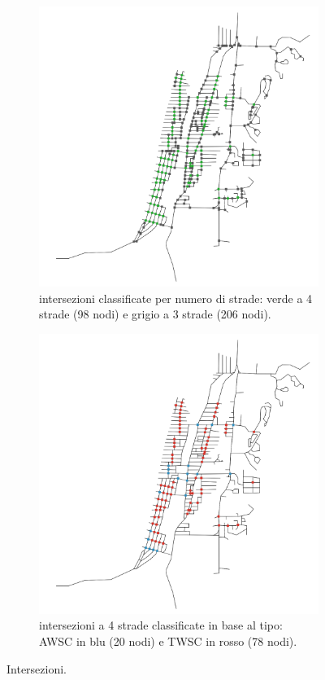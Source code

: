 \begin{figure}[ht]
    \centering
    \begin{subfigure}{0.475\textwidth}
        \includegraphics[width=\textwidth]{images/intersections}
        \caption{intersezioni classificate per numero di strade: verde a 4 strade (98 nodi) e grigio a 3 strade (206 nodi).}
        \label{fig:intersections}
    \end{subfigure}
    \hfill
    \begin{subfigure}{0.475\textwidth}
        \includegraphics[width=\textwidth]{images/int_type}
        \caption{intersezioni a 4 strade classificate in base al tipo: AWSC in blu (20 nodi) e TWSC in rosso (78 nodi).}
        \label{fig:intersections_types}
    \end{subfigure}
    \caption{Intersezioni.}
    \label{fig:ints_map}
\end{figure}

